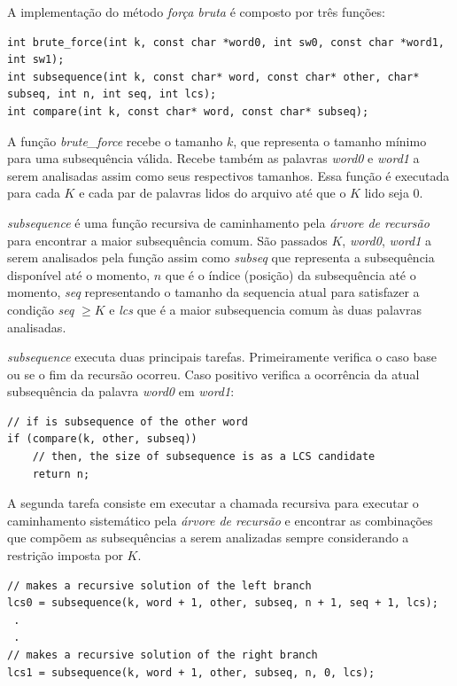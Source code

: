 A implementação do método \emph{força bruta} é composto por três funções:

\begin{lstlisting}
int brute_force(int k, const char *word0, int sw0, const char *word1, int sw1);
int subsequence(int k, const char* word, const char* other, char* subseq, int n, int seq, int lcs);
int compare(int k, const char* word, const char* subseq);
\end{lstlisting}

A função {\it brute\_force} recebe o tamanho $k$, que representa o 
tamanho mínimo para uma subsequência válida. Recebe também as 
palavras {\it word0} e {\it word1} a serem analisadas assim 
como seus respectivos tamanhos. Essa função é executada para cada $K$
e cada par de palavras lidos do arquivo até que o $K$ lido seja $0$.

{\it subsequence} é uma função recursiva de caminhamento pela 
\emph{árvore de recursão} para encontrar a maior subsequência comum.
São passados $K$, \emph{word0}, \emph{word1} a serem analisados pela
função assim como \emph{subseq} que representa a subsequência 
disponível até o momento, $n$ que é o índice (posição) da subsequência
até o momento, \emph{seq} representando o tamanho da sequencia atual 
para satisfazer a condição \emph{seq} $\ge K$ e \emph{lcs} que é 
a maior subsequencia comum às duas palavras analisadas. 

{\it subsequence} executa duas principais tarefas. Primeiramente 
verifica o caso base ou se o fim da recursão ocorreu. Caso positivo
verifica a ocorrência da atual subsequência da palavra \emph{word0} 
em \emph{word1}:

\begin{lstlisting}
// if is subsequence of the other word
if (compare(k, other, subseq))
    // then, the size of subsequence is as a LCS candidate
    return n;
\end{lstlisting}

A segunda tarefa consiste em executar a chamada recursiva para executar
o caminhamento sistemático pela \emph{árvore de recursão} e encontrar 
as combinações que compõem as subsequências a serem analizadas sempre 
considerando a restrição imposta por $K$.

\begin{lstlisting}
// makes a recursive solution of the left branch
lcs0 = subsequence(k, word + 1, other, subseq, n + 1, seq + 1, lcs);
 .
 .
// makes a recursive solution of the right branch
lcs1 = subsequence(k, word + 1, other, subseq, n, 0, lcs);
\end{lstlisting}

